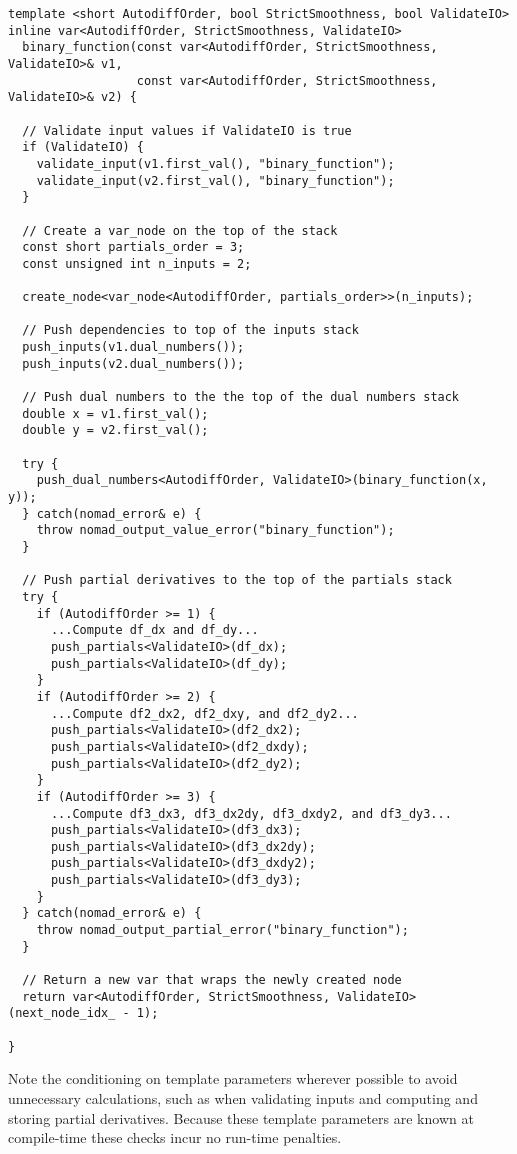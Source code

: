 \begin{verbatim}
template <short AutodiffOrder, bool StrictSmoothness, bool ValidateIO>
inline var<AutodiffOrder, StrictSmoothness, ValidateIO>
  binary_function(const var<AutodiffOrder, StrictSmoothness, ValidateIO>& v1,
                  const var<AutodiffOrder, StrictSmoothness, ValidateIO>& v2) {
    
  // Validate input values if ValidateIO is true
  if (ValidateIO) {
    validate_input(v1.first_val(), "binary_function");
    validate_input(v2.first_val(), "binary_function");
  }
      
  // Create a var_node on the top of the stack
  const short partials_order = 3;
  const unsigned int n_inputs = 2;
    
  create_node<var_node<AutodiffOrder, partials_order>>(n_inputs);

  // Push dependencies to top of the inputs stack
  push_inputs(v1.dual_numbers());
  push_inputs(v2.dual_numbers());

  // Push dual numbers to the the top of the dual numbers stack
  double x = v1.first_val();
  double y = v2.first_val();
    
  try {
    push_dual_numbers<AutodiffOrder, ValidateIO>(binary_function(x, y));
  } catch(nomad_error& e) {
    throw nomad_output_value_error("binary_function");
  }
    
  // Push partial derivatives to the top of the partials stack
  try {
    if (AutodiffOrder >= 1) {
      ...Compute df_dx and df_dy...
      push_partials<ValidateIO>(df_dx);
      push_partials<ValidateIO>(df_dy);
    }
    if (AutodiffOrder >= 2) {
      ...Compute df2_dx2, df2_dxy, and df2_dy2...
      push_partials<ValidateIO>(df2_dx2);
      push_partials<ValidateIO>(df2_dxdy);
      push_partials<ValidateIO>(df2_dy2);
    }
    if (AutodiffOrder >= 3) {
      ...Compute df3_dx3, df3_dx2dy, df3_dxdy2, and df3_dy3...
      push_partials<ValidateIO>(df3_dx3);
      push_partials<ValidateIO>(df3_dx2dy);
      push_partials<ValidateIO>(df3_dxdy2);
      push_partials<ValidateIO>(df3_dy3);
    }
  } catch(nomad_error& e) {
    throw nomad_output_partial_error("binary_function");
  }

  // Return a new var that wraps the newly created node
  return var<AutodiffOrder, StrictSmoothness, ValidateIO>(next_node_idx_ - 1);
    
}
\end{verbatim}
%
Note the conditioning on template parameters wherever possible to avoid
unnecessary calculations, such as when validating inputs and computing
and storing partial derivatives.  Because these template parameters are
known at compile-time these checks incur no run-time penalties.

